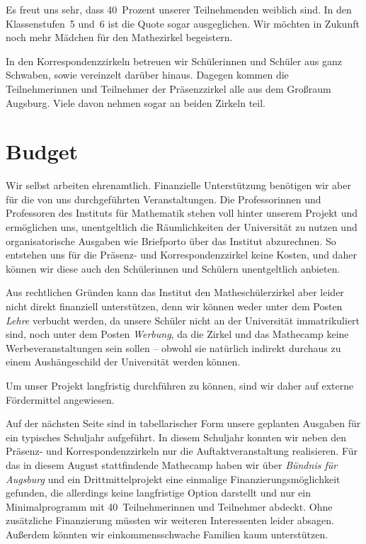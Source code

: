 \documentclass[12pt]{zettel}
\begin{document}
Es freut uns sehr, dass 40~Prozent unserer Teilnehmenden weiblich sind. In den Klassenstufen~5 und~6 ist die Quote sogar ausgeglichen. Wir möchten in Zukunft noch mehr Mädchen für den Mathezirkel begeistern.

In den Korrespondenzzirkeln betreuen wir Schülerinnen und Schüler aus ganz
Schwaben, sowie vereinzelt darüber hinaus. Dagegen kommen die Teilnehmerinnen
und Teilnehmer der Präsenzzirkel alle aus dem Großraum Augsburg. Viele davon
nehmen sogar an beiden Zirkeln teil.

\section{Budget}

Wir selbst arbeiten ehrenamtlich. Finanzielle Unterstützung benötigen wir aber
für die von uns durchgeführten Veranstaltungen. Die Professorinnen und
Professoren des Instituts für Mathematik stehen voll hinter unserem Projekt
und ermöglichen uns, unentgeltlich die Räumlichkeiten der Universität zu nutzen
und organisatorische Ausgaben wie Briefporto über das Institut abzurechnen.
So entstehen uns für die Präsenz- und Korrespondenzzirkel keine Kosten, und
daher können wir diese auch den Schülerinnen und Schülern unentgeltlich
anbieten.

Aus rechtlichen Gründen kann das Institut den Matheschülerzirkel aber leider nicht
direkt finanziell unterstützen, denn wir können weder unter dem Posten
\emph{Lehre} verbucht werden, da unsere Schüler nicht an der Universität
immatrikuliert sind, noch unter dem Posten \emph{Werbung}, da die Zirkel und
das Mathecamp keine Werbeveranstaltungen sein sollen -- obwohl sie natürlich indirekt
durchaus zu einem Aushängeschild der Universität werden können.

Um unser Projekt langfristig durchführen zu können, sind wir daher auf externe
Fördermittel angewiesen.

Auf der nächsten Seite sind in tabellarischer Form unsere geplanten Ausgaben für ein
typisches Schuljahr aufgeführt. In diesem Schuljahr konnten wir
neben den Präsenz- und Korrespondenzzirkeln nur die Auftaktveranstaltung
realisieren. Für das in diesem August
stattfindende Mathecamp haben wir über \emph{Bündnis für Augsburg} und ein
Drittmittelprojekt eine einmalige Finanzierungsmöglichkeit gefunden, die
allerdings keine langfristige Option darstellt und nur ein Minimalprogramm mit 40~Teil\-neh\-me\-rin\-nen und
Teilnehmer abdeckt. Ohne zusätzliche Finanzierung müssten wir weiteren
Interessenten leider absagen. Außerdem könnten wir einkommensschwache Familien
kaum unterstützen.
\end{document}
